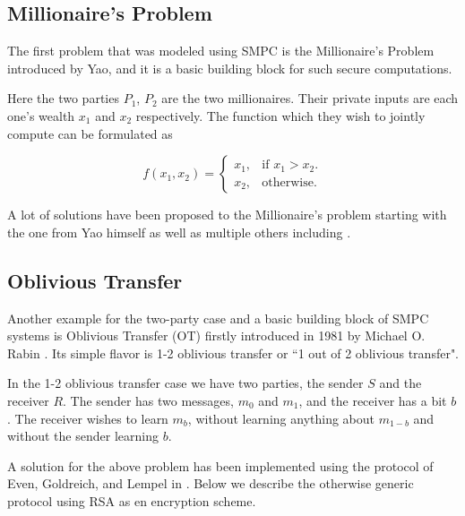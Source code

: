 \subsection{Millionaire's Problem}\label{ss:millionaire}
The first problem that was modeled using SMPC is the Millionaire's Problem introduced by Yao, and it is a basic building block for such secure computations.

Here the two parties $P_1$, $P_2$ are the two millionaires.
Their private inputs are each one’s wealth $x_1$ and $x_2$ respectively.
The function which they wish to jointly compute can be formulated as

\begin{equation}
  f(x_1, x_2)=\begin{cases}
    x_1, & \text{if $x_1 > x_2$}.\\
    x_2, & \text{otherwise}.
  \end{cases}
\end{equation}

A lot of solutions have been proposed to the Millionaire's problem starting with the one from Yao himself \cite{yao1982protocols} as well as multiple others including \cite{ioannidis2003efficient, lin2005efficient}.

\subsection{Oblivious Transfer}\label{ss:oblivious-transfer}
Another example for the two-party case and a basic building block of SMPC systems is Oblivious Transfer (OT) firstly introduced in 1981 by Michael O. Rabin \cite{rabin2005exchange}.
Its simple flavor is 1-2 oblivious transfer or ``1 out of 2 oblivious transfer".


In the 1-2 oblivious transfer case we have two parties, the sender $S$ and the receiver $R$.
The sender has two messages, $m_0$ and $m_1$, and the receiver has a bit $b$.
The receiver wishes to learn $m_b$, without learning anything about $m_{1-b}$ and without the sender learning $b$.

A solution for the above problem has been implemented using the protocol of Even, Goldreich, and Lempel in \cite{even1985randomized}.
Below we describe the otherwise generic protocol using RSA as en encryption scheme.

